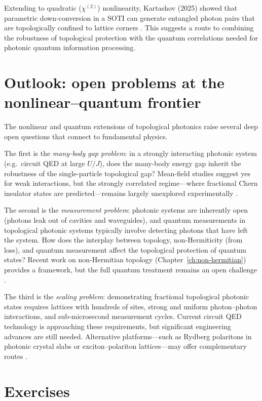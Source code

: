 Extending to quadratic ($\chi^{(2)}$) nonlinearity, Kartashov (2025)
showed that parametric down-conversion in a SOTI can generate
entangled photon pairs that are topologically confined to lattice
corners \cite{kartashov2025quadratic}.  This suggests a route to
combining the robustness of topological protection with the quantum
correlations needed for photonic quantum information processing.

\section{Outlook: open problems at the nonlinear--quantum frontier}
\label{sec:ch18-frontier-outlook}

The nonlinear and quantum extensions of topological photonics raise
several deep open questions that connect to fundamental physics.

The first is the \emph{many-body gap problem}: in a strongly
interacting photonic system (e.g.\ circuit QED at large $U/J$), does
the many-body energy gap inherit the robustness of the single-particle
topological gap?  Mean-field studies suggest yes for weak interactions,
but the strongly correlated regime---where fractional Chern insulator
states are predicted---remains largely unexplored experimentally
\cite{ozawa2018topological}.

The second is the \emph{measurement problem}: photonic systems are
inherently open (photons leak out of cavities and waveguides), and
quantum measurements in topological photonic systems typically involve
detecting photons that have left the system.  How does the interplay
between topology, non-Hermiticity (from loss), and quantum measurement
affect the topological protection of quantum states?  Recent work on
non-Hermitian topology (Chapter~\ref{ch:non-hermitian}) provides a
framework, but the full quantum treatment remains an open challenge
\cite{wang2021topological,ding2022non}.

The third is the \emph{scaling problem}: demonstrating fractional
topological photonic states requires lattices with hundreds of sites,
strong and uniform photon--photon interactions, and sub-microsecond
measurement cycles.  Current circuit QED technology is approaching
these requirements, but significant engineering advances are still
needed.  Alternative platforms---such as Rydberg polaritons in
photonic crystal slabs or exciton--polariton lattices---may offer
complementary routes \cite{price2022roadmap}.

\section*{Exercises}


